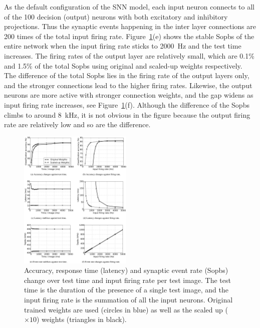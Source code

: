 \documentclass{frontiersENG} %
\begin{document}
As the default configuration of the SNN model, each input neuron connects to all of the 100 decision (output) neurons with both excitatory and inhibitory projections.
Thus the synaptic events happening in the inter layer connections are 200 times of the total input firing rate.
Figure~\ref{fig:assess}(e) shows the stable Sopbs of the entire network when the input firing rate sticks to 2000~Hz and the test time increases.
The firing rates of the output layer are relatively small, which are 0.1\% and 1.5\% of the total Sopbs using original and scaled-up weights respectively.
The difference of the total Sopbs lies in the firing rate of the output layers only, and the stronger connections lead to the higher firing rates.
Likewise, the output neurons are more active with stronger connection weights, and the gap widens as input firing rate increases, see Figure~\ref{fig:assess}(f).
Although the difference of the Sopbs climbs to around 8~kHz, it is not obvious in the figure because the output firing rate are relatively low and so are the difference.
\begin{figure}[htb!]
	\centering
	\includegraphics[width=0.48\textwidth]{fig7}
	\caption{Accuracy, response time (latency) and synaptic event rate (Sopbs) change over test time and input firing rate per test image.
	The test time is the duration of the presence of a single test image, and the input firing rate is the summation of all the input neurons.
	Original trained weights are used (circles in blue) as well as the scaled up ($\times10$) weights (triangles in black). }
	\label{fig:assess}
\end{figure}
\end{document}
